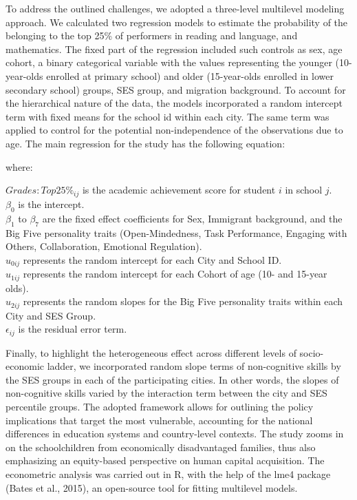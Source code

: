 \documentclass{article}
\begin{document}
To address the outlined challenges, we adopted a three-level multilevel
modeling approach. We calculated two regression models to estimate the
probability of the belonging to the top 25\% of performers in reading
and language, and mathematics. The fixed part of the regression included
such controls as sex, age cohort, a binary categorical variable with the
values representing the younger (10-year-olds enrolled at primary
school) and older (15-year-olds enrolled in lower secondary school)
groups, SES group, and migration background. To account for the
hierarchical nature of the data, the models incorporated a random
intercept term with fixed means for the school id within each city. The
same term was applied to control for the potential non-independence of
the observations due to age. The main regression for the study has the
following equation:

where:

\(Grades: Top 25\%_{ij}\) is the academic achievement score for student
\(i\) in school \(j\).\\
\(\beta_0\) is the intercept.\\
\(\beta_1\) to \(\beta_7\) are the fixed effect coefficients for Sex,
Immigrant background, and the Big Five personality traits
(Open-Mindedness, Task Performance, Engaging with Others, Collaboration,
Emotional Regulation).\\
\(u_{0ij}\) represents the random intercept for each City and School
ID.\\
\(u_{1ij}\) represents the random intercept for each Cohort of age (10-
and 15-year olds).\\
\(u_{2ij}\) represents the random slopes for the Big Five personality
traits within each City and SES Group.\\
\(\epsilon_{ij}\) is the residual error term.

Finally, to highlight the heterogeneous effect across different levels
of socio-economic ladder, we incorporated random slope terms of
non-cognitive skills by the SES groups in each of the participating
cities. In other words, the slopes of non-cognitive skills varied by the
interaction term between the city and SES percentile groups. The adopted
framework allows for outlining the policy implications that target the
most vulnerable, accounting for the national differences in education
systems and country-level contexts. The study zooms in on the
schoolchildren from economically disadvantaged families, thus also
emphasizing an equity-based perspective on human capital acquisition.
The econometric analysis was carried out in R, with the help of the lme4
package (Bates et al., 2015), an open-source tool for fitting multilevel
models.
\end{document}
